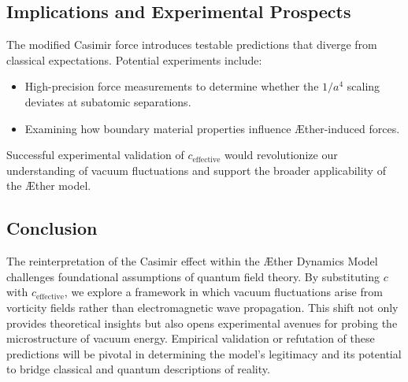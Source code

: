     \subsection*{Implications and Experimental Prospects}
    The modified Casimir force introduces testable predictions that diverge from classical expectations. Potential experiments include:
    \begin{itemize}
        \item High-precision force measurements to determine whether the $1/a^4$ scaling deviates at subatomic separations.
        \item Examining how boundary material properties influence Æther-induced forces.
    \end{itemize}
    Successful experimental validation of $c_\text{effective}$ would revolutionize our understanding of vacuum fluctuations and support the broader applicability of the Æther model.

    \subsection*{Conclusion}
    The reinterpretation of the Casimir effect within the Æther Dynamics Model challenges foundational assumptions of quantum field theory. By substituting $c$ with $c_\text{effective}$, we explore a framework in which vacuum fluctuations arise from vorticity fields rather than electromagnetic wave propagation. This shift not only provides theoretical insights but also opens experimental avenues for probing the microstructure of vacuum energy. Empirical validation or refutation of these predictions will be pivotal in determining the model's legitimacy and its potential to bridge classical and quantum descriptions of reality.

